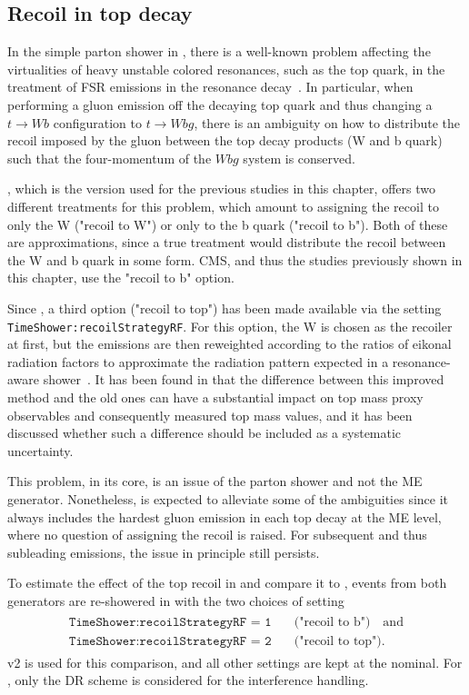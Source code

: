 \subsection{Recoil in top decay}
\label{sec:bb4l:recoil}

In the simple parton shower in \pythia, there is a well-known problem affecting the virtualities of heavy unstable colored resonances, such as the top quark, in the treatment of FSR emissions in the resonance decay~\cite{Brooks:2019xso}. In particular, when performing a gluon emission off the decaying top quark and thus changing a $t \rightarrow Wb$ configuration to $t \rightarrow Wbg$, there is an ambiguity on how to distribute the recoil imposed by the gluon between the top decay products (W and b quark) such that the four-momentum of the $Wbg$ system is conserved.

, which is the version used for the previous studies in this chapter, offers two different treatments for this problem, which amount to assigning the recoil to only the W ("recoil to W") or only to the b quark ("recoil to b"). Both of these are approximations, since a true treatment would distribute the recoil between the W and b quark in some form. CMS, and thus the studies previously shown in this chapter, use the "recoil to b" option.

Since , a third option ("recoil to top") has been made available via the setting \texttt{TimeShower:recoilStrategyRF}. For this option, the W is chosen as the recoiler at first, but the emissions are then reweighted according to the ratios of eikonal radiation factors to approximate the radiation pattern expected in a resonance-aware shower~\cite{Brooks:2019xso}. It has been found in  that the difference between this improved method and the old ones can have a substantial impact on top mass proxy observables and consequently measured top mass values, and it has been discussed whether such a difference should be included as a systematic uncertainty.

This problem, in its core, is an issue of the parton shower and not the ME generator. Nonetheless, \bbfourl is expected to alleviate some of the ambiguities since it always includes the hardest gluon emission in each top decay at the ME level, where no question of assigning the recoil is raised. For subsequent and thus subleading emissions, the issue in principle still persists.

To estimate the effect of the top recoil in \bbfourl and compare it to \tttWsum, events from both generators are re-showered in  with the two choices of setting
\begin{align*}
\begin{split}
  \texttt{TimeShower:recoilStrategyRF = 1} &\quad \text{("recoil to b")} \quad \text{and} \\
  \texttt{TimeShower:recoilStrategyRF = 2} &\quad \text{("recoil to top")}.
\end{split}
\end{align*}
\bbfourl v2 is used for this comparison, and all other settings are kept at the nominal. For \tttWsum, only the DR scheme is considered for the interference handling.

